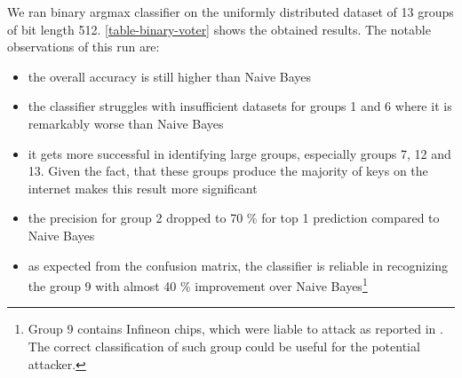 We ran binary argmax classifier on the uniformly distributed dataset of 13 groups of bit length 512. \autoref{table-binary-voter} shows the obtained results. The notable observations of this run are:

\begin{itemize}

\item the overall accuracy is still higher than Naive Bayes

\item the classifier struggles with insufficient datasets for groups 1 and 6 where it is remarkably worse than Naive Bayes

\item it gets more successful in identifying large groups, especially groups 7, 12 and 13. Given the fact, that these groups produce the majority of keys on the internet makes this result more significant

\item the precision for group 2 dropped to 70 \% for top 1 prediction compared to Naive Bayes

\item as expected from the confusion matrix, the classifier is reliable in recognizing the group 9 with almost 40 \% improvement over Naive Bayes\footnote{Group 9 contains Infineon chips, which were liable to attack as reported in \cite{svenda_2}. The correct classification of such group could be useful for the potential attacker.}

\end{itemize}

